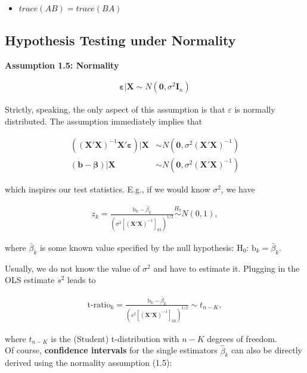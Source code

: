 \documentclass[]{book}
\providecommand{\tightlist}{%
  \setlength{\itemsep}{0pt}\setlength{\parskip}{0pt}}
\theoremstyle{definition}
\theoremstyle{definition}
\theoremstyle{definition}
\theoremstyle{remark}
\begin{document}
\begin{itemize}
\tightlist
\item
  \(trace(AB)=trace(BA)\)

\end{itemize}

\hypertarget{Testing}{%
\subsection{Hypothesis Testing under Normality}\label{Testing}}

\textbf{Assumption 1.5: Normality}

\[
\begin{align*}
  \boldsymbol{\varepsilon}|\mathbf{X}\sim N(\mathbf{0},\sigma^2 \mathbf{I}_n)
\end{align*}
\]

Strictly, speaking, the only aspect of this assumption is that \(\varepsilon\) is
normally distributed. The assumption immediately implies that

\[
\begin{align*}
  ((\mathbf{X}'\mathbf{X})^{-1}\mathbf{X}'\boldsymbol{\varepsilon})|\mathbf{X}&\sim N(\mathbf{0},\sigma^2 (\mathbf{X}'\mathbf{X})^{-1})\\
  (\mathbf{b}-\boldsymbol{\beta})|\mathbf{X}&\sim N(\mathbf{0},\sigma^2 (\mathbf{X}'\mathbf{X})^{-1})
\end{align*}
\]

which inspires our test statistics. E.g., if we would know \(\sigma^2\),
we have

\[
\begin{align*}
  z_k=\frac{\text{b}_k-\bar{\beta}_k}{\left(\sigma^2\left[(\mathbf{X}'\mathbf{X})^{-1}\right]_{kk}\right)^{1/2}}\overset{H_0}{\sim} N(0,1),
\end{align*}
\]

where \(\bar{\beta}_k\) is some known value specified by the null
hypothesis: \(\text{H}_0\): \(\text{b}_k=\bar{\beta}_k\).

Usually, we do not know the value of \(\sigma^2\) and have to estimate it.
Plugging in the OLS estimate \(s^2\) leads to

\[
\begin{align*}
  \text{t-ratio}_k=\frac{\text{b}_k-\bar{\beta}_k}{\left(s^2\left[(\mathbf{X}'\mathbf{X})^{-1}\right]_{kk}\right)^{1/2}}\sim t_{n-K},
\end{align*}
\]

where \(t_{n-K}\) is the (Student) t-distribution with \(n-K\) degrees of
freedom.\\
Of course, \textbf{confidence intervals} for the single estimators
\(\hat\beta_k\) can also be directly derived using the normality assumption (1.5):
\end{document}
